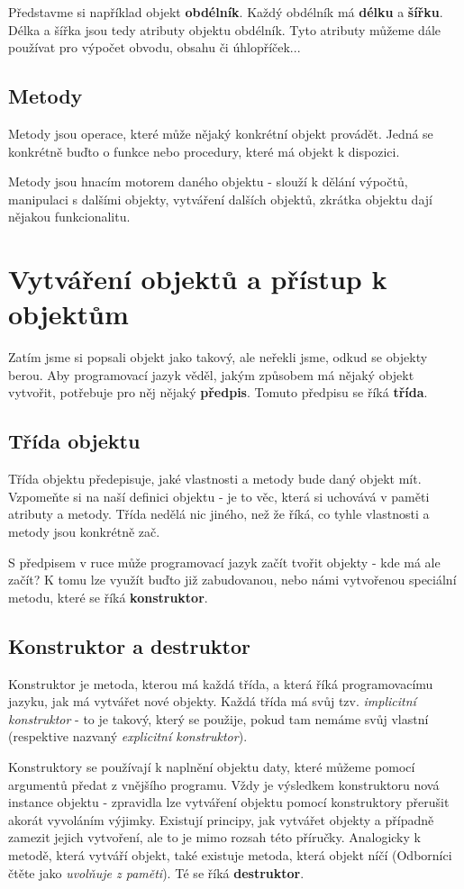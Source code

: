 Představme si například objekt \textbf{obdélník}. Každý obdélník má \textbf{délku} a \textbf{šířku}. Délka a šířka jsou tedy atributy objektu obdélník. Tyto atributy můžeme dále používat pro výpočet obvodu, obsahu či úhlopříček...

\subsection{Metody}
Metody jsou operace, které může nějaký konkrétní objekt provádět. Jedná se konkrétně buďto o funkce nebo procedury, které má objekt k dispozici.

Metody jsou hnacím motorem daného objektu - slouží k dělání výpočtů, manipulaci s dalšími objekty, vytváření dalších objektů, zkrátka objektu dají nějakou funkcionalitu.

\section{Vytváření objektů a přístup k objektům}
Zatím jsme si popsali objekt jako takový, ale neřekli jsme, odkud se objekty berou. Aby programovací jazyk věděl, jakým způsobem má nějaký objekt vytvořit, potřebuje pro něj nějaký \textbf{předpis}. Tomuto předpisu se říká \textbf{třída}.

\subsection{Třída objektu}
Třída objektu předepisuje, jaké vlastnosti a metody bude daný objekt mít. Vzpomeňte si na naší definici objektu - je to věc, která si uchovává v paměti atributy a metody. Třída nedělá nic jiného, než že říká, co tyhle vlastnosti a metody jsou konkrétně zač.

S předpisem v ruce může programovací jazyk začít tvořit objekty - kde má ale začít? K tomu lze využít buďto již zabudovanou, nebo námi vytvořenou speciální metodu, které se říká \textbf{konstruktor}.

\subsection{Konstruktor a destruktor}
Konstruktor je metoda, kterou má každá třída, a která říká programovacímu jazyku, jak má vytvářet nové objekty. Každá třída má svůj tzv. \textit{implicitní konstruktor} - to je takový, který se použije, pokud tam nemáme svůj vlastní (respektive nazvaný \textit{explicitní konstruktor}).

Konstruktory se používají k naplnění objektu daty, které můžeme pomocí argumentů předat z vnějšího programu. Vždy je výsledkem konstruktoru nová instance objektu - zpravidla lze vytváření objektu pomocí konstruktory přerušit akorát vyvoláním výjimky. Existují principy, jak vytvářet objekty a případně zamezit jejich vytvoření, ale to je mimo rozsah této příručky. Analogicky k metodě, která vytváří objekt, také existuje metoda, která objekt níčí (Odborníci čtěte jako \textit{uvolňuje z paměti}). Té se říká \textbf{destruktor}.

